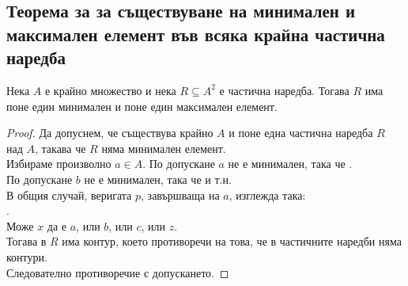 \subsection*{Теорема за за съществуване на минимален и максимален елемент във всяка крайна частична наредба}
\begin{theorem}
    Нека \(A\) е крайно множество и нека \(R \subseteq A^2\) е частична наредба. Тогава \(R\) има поне един 
    минимален и поне един максимален елемент.
\end{theorem}
\begin{proof}
    Да допуснем, че съществува крайно \(A\) и поне една частична наредба \(R\) над \(A\), такава че \(R\) няма
    минимален елемент. \\
    Избираме произволно \(a \in A\). По допускане \(a\) не е минимален, така че 
    . \\
    По допускане \(b\) не е минимален, така че  и т.н. \\
    В общия случай, веригата \(p\), завършваща на \(a\), изглежда така: \\
    . \\
    Може \(x\) да е \(a\), или \(b\), или \(c\), или \(z\). \\
    Тогава в \(R\) има контур, което противоречи на това, че в частичните наредби няма контури. \\
    Следователно противоречие с допускането.
\end{proof}

